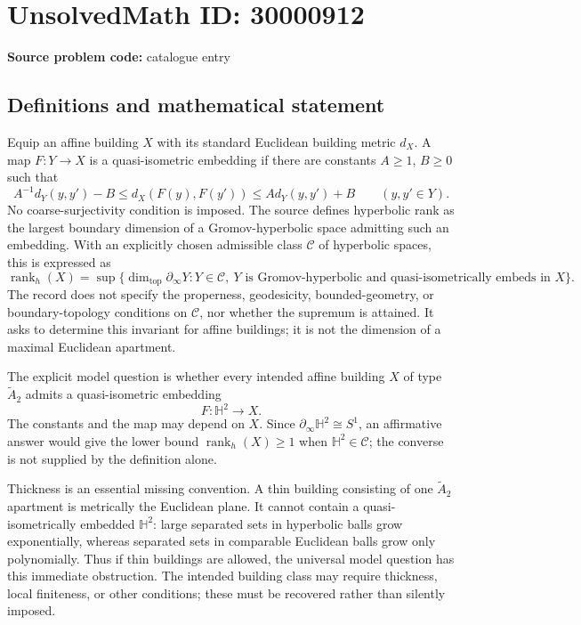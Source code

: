 \documentclass[11pt]{article}
\begin{document}
\section*{UnsolvedMath ID: 30000912}
\textbf{Source problem code:} catalogue entry
\subsection{Definitions and mathematical statement}
Equip an affine building \(X\) with its standard Euclidean building metric \(d_X\). A map \(F:Y\to X\) is a quasi-isometric embedding if there are constants \(A\geq1\), \(B\geq0\) such that
\[
 A^{-1}d_Y(y,y')-B\leq d_X(F(y),F(y'))
 \leq A d_Y(y,y')+B\qquad(y,y'\in Y).
\]
No coarse-surjectivity condition is imposed. The source defines hyperbolic rank as the largest boundary dimension of a Gromov-hyperbolic space admitting such an embedding. With an explicitly chosen admissible class \(\mathcal C\) of hyperbolic spaces, this is expressed as
\[
 \operatorname{rank}_h(X)=\sup\{\dim_{\mathrm{top}}\partial_\infty Y:
  Y\in\mathcal C,\ Y\text{ is Gromov-hyperbolic and quasi-isometrically embeds in }X\}.
\]
The record does not specify the properness, geodesicity, bounded-geometry, or boundary-topology conditions on \(\mathcal C\), nor whether the supremum is attained. It asks to determine this invariant for affine buildings; it is not the dimension of a maximal Euclidean apartment.

The explicit model question is whether every intended affine building \(X\) of type \(\widetilde A_2\) admits a quasi-isometric embedding
\[
 F:\mathbb H^2\longrightarrow X.
\]
The constants and the map may depend on \(X\). Since \(\partial_\infty\mathbb H^2\cong S^1\), an affirmative answer would give the lower bound \(\operatorname{rank}_h(X)\geq1\) when \(\mathbb H^2\in\mathcal C\); the converse is not supplied by the definition alone.

Thickness is an essential missing convention. A thin building consisting of one \(\widetilde A_2\) apartment is metrically the Euclidean plane. It cannot contain a quasi-isometrically embedded \(\mathbb H^2\): large separated sets in hyperbolic balls grow exponentially, whereas separated sets in comparable Euclidean balls grow only polynomially. Thus if thin buildings are allowed, the universal model question has this immediate obstruction. The intended building class may require thickness, local finiteness, or other conditions; these must be recovered rather than silently imposed.
\end{document}
